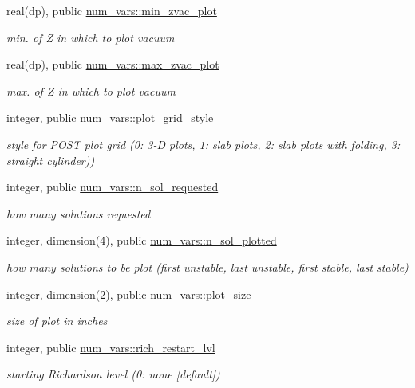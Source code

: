 \begin{DoxyCompactItemize}
real(dp), public \hyperlink{namespacenum__vars_ab9fd7d4e9921ff8ceab88317f0c1ae5f}{num\+\_\+vars\+::min\+\_\+zvac\+\_\+plot}
\begin{DoxyCompactList}\small\item\em min. of {\ttfamily Z} in which to plot vacuum \end{DoxyCompactList}\item 
real(dp), public \hyperlink{namespacenum__vars_a6057251380bbdf0bf71cee48c49ab84c}{num\+\_\+vars\+::max\+\_\+zvac\+\_\+plot}
\begin{DoxyCompactList}\small\item\em max. of {\ttfamily Z} in which to plot vacuum \end{DoxyCompactList}\item 
integer, public \hyperlink{namespacenum__vars_a0e40187c6517fb55cc756c5656327fb9}{num\+\_\+vars\+::plot\+\_\+grid\+\_\+style}
\begin{DoxyCompactList}\small\item\em style for P\+O\+ST plot grid (0\+: 3-\/D plots, 1\+: slab plots, 2\+: slab plots with folding, 3\+: straight cylinder)) \end{DoxyCompactList}\item 
integer, public \hyperlink{namespacenum__vars_a3deb68d5c9cd3a99c9dd779e18c4d129}{num\+\_\+vars\+::n\+\_\+sol\+\_\+requested}
\begin{DoxyCompactList}\small\item\em how many solutions requested \end{DoxyCompactList}\item 
integer, dimension(4), public \hyperlink{namespacenum__vars_a98df35edce5a42616685bb1ebd508c79}{num\+\_\+vars\+::n\+\_\+sol\+\_\+plotted}
\begin{DoxyCompactList}\small\item\em how many solutions to be plot (first unstable, last unstable, first stable, last stable) \end{DoxyCompactList}\item 
integer, dimension(2), public \hyperlink{namespacenum__vars_a3bd355d04302c5d45685a0e1e3f6b1f6}{num\+\_\+vars\+::plot\+\_\+size}
\begin{DoxyCompactList}\small\item\em size of plot in inches \end{DoxyCompactList}\item 
integer, public \hyperlink{namespacenum__vars_ac4bc885e8034c285bf0a9b76a832a738}{num\+\_\+vars\+::rich\+\_\+restart\+\_\+lvl}
\begin{DoxyCompactList}\small\item\em starting Richardson level (0\+: none \mbox{[}default\mbox{]}) \end{DoxyCompactList}\item 

\end{DoxyCompactItemize}
